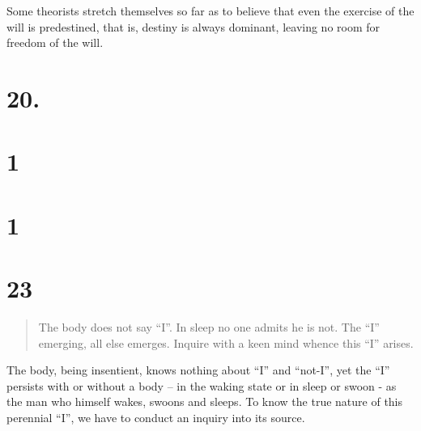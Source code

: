 \documentclass[12pt]{report}
\begin{document}
Some theorists stretch themselves so far as to believe that even the
exercise of the will is predestined, that is, destiny is always
dominant, leaving no room for freedom of the will.

\section{20. }

\begin{quote}

\end{quote}


\section{1}

\begin{quote}

\end{quote}


\section{1}

\begin{quote}

\end{quote}




\section{23}

\begin{quote}
  The body does not say ``I''. In sleep no one admits he is not. The
  ``I'' emerging, all else emerges. Inquire with a keen mind whence this
  ``I'' arises.
\end{quote}

The body, being insentient, knows nothing about ``I'' and ``not-I'',
yet the ``I'' persists with or without a body -- in the waking state
or in sleep or swoon - as the man who himself wakes, swoons and
sleeps. To know the true nature of this perennial ``I'', we have to
conduct an inquiry into its source.
\end{document}
